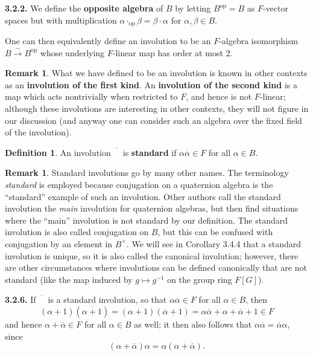 \documentclass{article}
\theoremstyle{definition}
\newtheorem{definition}[theorem]{Definition}
\newtheorem{remark}[theorem]{Remark}
\begin{document}
\textbf{3.2.2.} We define the \textbf{opposite algebra} of $B$ by letting $B^{\text{op}} = B$ as $F$-vector spaces but with multiplication $\alpha \cdot_{\text{op}} \beta = \beta \cdot \alpha$ for $\alpha, \beta \in B$.

One can then equivalently define an involution to be an $F$-algebra isomorphism $B \xrightarrow{\sim} B^{\text{op}}$ whose underlying $F$-linear map has order at most 2.

\begin{remark}
What we have defined to be an involution is known in other contexts as an \textbf{involution of the first kind}. An \textbf{involution of the second kind} is a map which acts nontrivially when restricted to $F$, and hence is not $F$-linear; although these involutions are interesting in other contexts, they will not figure in our discussion (and anyway one can consider such an algebra over the fixed field of the involution).
\end{remark}

\begin{definition}
An involution $\overline{\phantom{B}}$ is \textbf{standard} if $\alpha\overline{\alpha} \in F$ for all $\alpha \in B$.
\end{definition}

\begin{remark}
Standard involutions go by many other names. The terminology \emph{standard} is employed because conjugation on a quaternion algebra is the ``standard'' example of such an involution. Other authors call the standard involution the \emph{main} involution for quaternion algebras, but then find situations where the ``main'' involution is not standard by our definition. The standard involution is also called conjugation on $B$, but this can be confused with conjugation by an element in $B^\times$. We will see in Corollary 3.4.4 that a standard involution is unique, so it is also called the canonical involution; however, there are other circumstances where involutions can be defined canonically that are not standard (like the map induced by $g \mapsto g^{-1}$ on the group ring $F[G]$).
\end{remark}

\textbf{3.2.6.} If $\overline{\phantom{B}}$ is a standard involution, so that $\alpha\overline{\alpha} \in F$ for all $\alpha \in B$, then
$$(\alpha + 1)(\overline{\alpha + 1}) = (\alpha + 1)(\overline{\alpha} + 1) = \alpha\overline{\alpha} + \alpha + \overline{\alpha} + 1 \in F$$
and hence $\alpha + \overline{\alpha} \in F$ for all $\alpha \in B$ as well; it then also follows that $\alpha\overline{\alpha} = \overline{\alpha}\alpha$, since
$$(\alpha + \overline{\alpha})\alpha = \alpha(\alpha + \overline{\alpha}).$$
\end{document}
